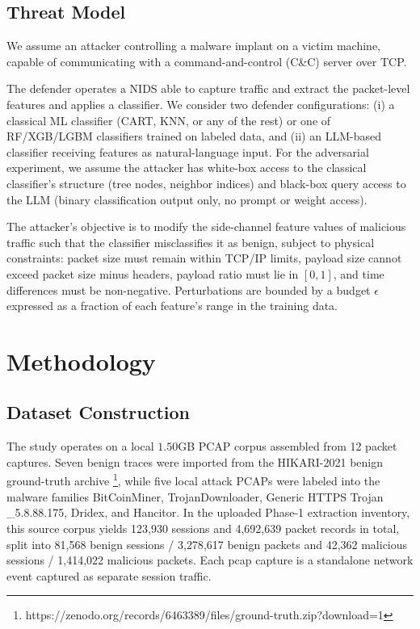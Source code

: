 \documentclass[conference]{IEEEtran}
\begin{document}
\subsection{Threat Model}

We assume an attacker controlling a malware implant on a victim machine, capable of communicating with a command-and-control (C\&C) server over TCP. 

The defender operates a NIDS able to capture traffic and extract the packet-level features and applies a classifier. We consider two defender configurations: (i) a classical ML classifier (CART, KNN, or any of the rest) or one of RF/XGB/LGBM classifiers trained on labeled data, and (ii) an LLM-based classifier receiving features as natural-language input. For the adversarial experiment, we assume the attacker has white-box access to the classical classifier's structure (tree nodes, neighbor indices) and black-box query access to the LLM (binary classification output only, no prompt or weight access). 

The attacker's objective is to modify the side-channel feature values of malicious traffic such that the classifier misclassifies it as benign, subject to physical constraints: packet size must remain within TCP/IP limits, payload size cannot exceed packet size minus headers, payload ratio must lie in $[0, 1]$, and time differences must be non-negative. Perturbations are bounded by a budget $\epsilon$ expressed as a fraction of each feature's range in the training data.



\section{Methodology}
\label{sec:methodology}

\subsection{Dataset Construction}

The study operates on a local $1.50$GB PCAP corpus assembled from 12 packet captures. Seven benign traces were imported from the HIKARI-2021 benign ground-truth archive \footnote{https://zenodo.org/records/6463389/files/ground-truth.zip?download=1}, while five local attack PCAPs were labeled into the malware families BitCoinMiner, TrojanDownloader, Generic HTTPS Trojan \_5.8.88.175, Dridex, and Hancitor. In the uploaded Phase-1 extraction inventory, this source corpus yields 123{,}930 sessions and 4{,}692{,}639 packet records in total, split into 81{,}568 benign sessions / 3{,}278{,}617 benign packets and 42{,}362 malicious sessions / 1{,}414{,}022 malicious packets. Each pcap capture is a standalone network event captured as separate session traffic.
\end{document}
